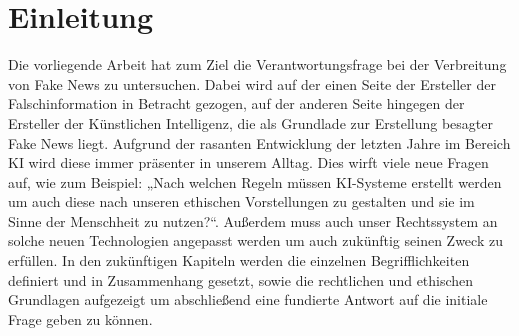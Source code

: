 \documentclass[Thesis.tex]{subfiles}
\begin{document}
\section{Einleitung}
Die vorliegende Arbeit hat zum Ziel die Verantwortungsfrage bei der 
Verbreitung von Fake News zu untersuchen. Dabei wird auf der einen 
Seite der Ersteller der Falschinformation in Betracht gezogen, auf 
der anderen Seite hingegen der Ersteller der Künstlichen Intelligenz, 
die als Grundlade zur Erstellung besagter Fake News liegt. Aufgrund der
rasanten Entwicklung der letzten Jahre im Bereich KI wird diese immer 
präsenter in unserem Alltag. Dies wirft viele neue Fragen auf, wie zum
Beispiel: „Nach welchen Regeln müssen KI-Systeme erstellt werden um
auch diese nach unseren ethischen Vorstellungen zu gestalten und sie 
im Sinne der Menschheit zu nutzen?“. Außerdem muss auch unser Rechtssystem
an solche neuen Technologien angepasst werden um auch zukünftig 
seinen Zweck zu erfüllen. In den zukünftigen Kapiteln werden die
einzelnen Begrifflichkeiten definiert und in Zusammenhang gesetzt, 
sowie die rechtlichen und ethischen Grundlagen aufgezeigt um 
abschließend eine fundierte Antwort auf die initiale Frage geben
zu können. 

\clearpage
\end{document}
